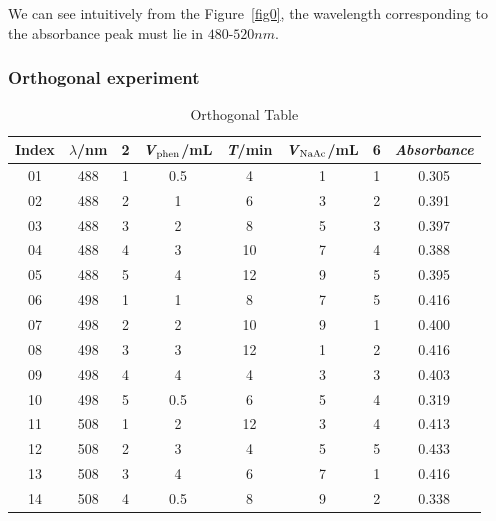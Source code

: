 We can see intuitively from the Figure~\ref{fig0}, the wavelength corresponding to the absorbance peak must lie in $480$-$520nm$.


\subsubsection{Orthogonal experiment}
\begin{table}[H]
	\caption{Orthogonal Table}
	\label{Tab.Ort}
	\begin{tabular}{cccccccc}
	\toprule
	Index & $\lambda$/nm  & 2 &\emph{V$_{\ce{phen}}$}/mL & \emph{T}/min &\emph{V$_{\ce{NaAc}}$}/mL & 6 & \emph{Absorbance}\\
	\midrule
	01    & 488           & 1 & 0.5                & 4     & 1                  & 1 & 0.305     \\
	02    & 488           & 2 & 1                  & 6     & 3                  & 2 & 0.391     \\
	03    & 488           & 3 & 2                  & 8     & 5                  & 3 & 0.397     \\
	04    & 488           & 4 & 3                  & 10    & 7                  & 4 & 0.388     \\
	05    & 488           & 5 & 4                  & 12    & 9                  & 5 & 0.395     \\
	06    & 498           & 1 & 1                  & 8     & 7                  & 5 & 0.416     \\
	07    & 498           & 2 & 2                  & 10    & 9                  & 1 & 0.400     \\
	08    & 498           & 3 & 3                  & 12    & 1                  & 2 & 0.416     \\
	09    & 498           & 4 & 4                  & 4     & 3                  & 3 & 0.403     \\
	10    & 498           & 5 & 0.5                & 6     & 5                  & 4 & 0.319     \\
	11    & 508           & 1 & 2                  & 12    & 3                  & 4 & 0.413     \\
	12    & 508           & 2 & 3                  & 4     & 5                  & 5 & 0.433     \\
	13    & 508           & 3 & 4                  & 6     & 7                  & 1 & 0.416     \\
	14    & 508           & 4 & 0.5                & 8     & 9                  & 2 & 0.338     \\

\end{tabular}
\end{table}
